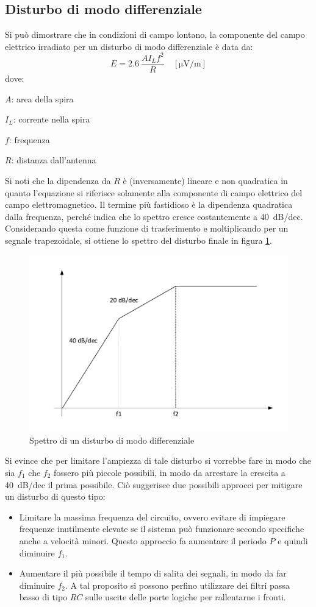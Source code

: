 \documentclass[11pt,4paper]{report}
\begin{document}
\subsection{Disturbo di modo differenziale}
Si può dimostrare che in condizioni di campo lontano, la componente del campo elettrico irradiato per un disturbo di modo differenziale è data da:
\begin{equation}
	E = 2.6\ \frac{AI_L f^2}{R} \quad [\si{\micro\volt\per\meter}]
\end{equation}
dove:
\begin{description}
	\item $A$: area della spira
	\item $I_L$: corrente nella spira
	\item $f$: frequenza
	\item $R$: distanza dall'antenna
\end{description}

Si noti che la dipendenza da $R$ è (inversamente) lineare e non quadratica in quanto l'equazione si riferisce solamente alla componente di campo elettrico del campo elettromagnetico. Il termine più fastidioso è la dipendenza quadratica dalla frequenza, perché indica che lo spettro cresce costantemente a \SI{40}{dB/dec}. Considerando questa come funzione di trasferimento e moltiplicando per un segnale trapezoidale, si ottiene lo spettro del disturbo finale in figura \ref{fig:diff_spettro}.

\begin{figure}[hbtp]
	\centering
	\includegraphics[width=0.6\linewidth]{emc/diff_spettro}
	\caption{Spettro di un disturbo di modo differenziale}
	\label{fig:diff_spettro}
\end{figure}

Si evince che per limitare l'ampiezza di tale disturbo si vorrebbe fare in modo che sia $f_1$ che $f_2$ fossero più piccole possibili, in modo da arrestare la crescita a \SI{40}{dB/dec} il prima possibile. Ciò suggerisce due possibili approcci per mitigare un disturbo di questo tipo:
\begin{itemize}
\item Limitare la massima frequenza del circuito, ovvero evitare di impiegare frequenze inutilmente elevate se il sistema può funzionare secondo specifiche anche a velocità minori. Questo approccio fa aumentare il periodo $P$ e quindi diminuire $f_1$.
\item Aumentare il più possibile il tempo di salita dei segnali, in modo da far diminuire $f_2$. A tal proposito si possono perfino utilizzare dei filtri passa basso di tipo $RC$ sulle uscite delle porte logiche per rallentarne i fronti.
\end{itemize}
\end{document}

